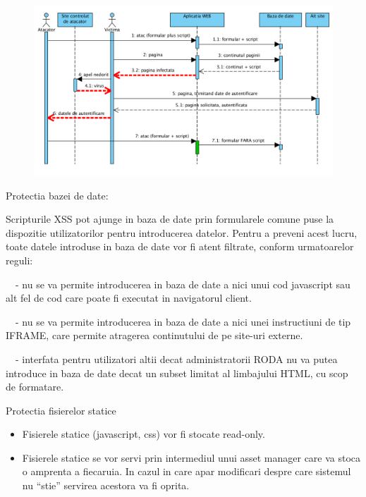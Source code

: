 \begin{figure}[hbt]
\centering
\includegraphics[width=\textwidth]{SecuritateaarhiveiRODA-img004.png} 
\label{fig:img004}
\end{figure}

Protectia bazei de date:

{\sffamily\color{black}
Scripturile XSS pot ajunge in baza de date prin formularele comune puse la dispozitie utilizatorilor pentru introducerea
datelor. Pentru a preveni acest lucru, toate datele introduse in baza de date vor fi atent filtrate, conform
urmatoarelor reguli:}

{\sffamily\color{black}
\ \ {}- nu se va permite introducerea in baza de date a nici unui cod javascript sau alt fel de cod care poate fi
executat in navigatorul client. }

{\sffamily\color{black}
\ \ {}- nu se va permite introducerea in baza de date a nici unei instructiuni de tip IFRAME, care permite atragerea
continutului de pe site-uri externe. }

{\sffamily\color{black}
\ \ {}- interfata pentru utilizatori altii decat administratorii RODA nu va putea introduce in baza de date decat un
subset limitat al limbajului HTML, cu scop de formatare. }

{\sffamily\color{black}
Protectia fisierelor statice}
\begin{itemize}
  \item 
  Fisierele statice (javascript, css) vor fi stocate read-only.
  \item 
  Fisierele statice se vor servi prin intermediul unui asset manager care va stoca o amprenta a fiecaruia. In cazul in
care apar modificari despre care sistemul nu ``stie'' servirea acestora va fi oprita.
\end{itemize}

